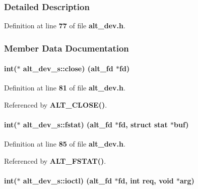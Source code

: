 \subsubsection{Detailed Description}


Definition at line {\bf 77} of file {\bf alt\+\_\+dev.\+h}.



\subsubsection{Member Data Documentation}
\paragraph[{close}]{\setlength{\rightskip}{0pt plus 5cm}int($\ast$ alt\+\_\+dev\+\_\+s\+::close) ({\bf alt\+\_\+fd} $\ast$fd)}\label{structalt__dev__s_a66e8627cb39b60dcb9623fa288c2284d}


Definition at line {\bf 81} of file {\bf alt\+\_\+dev.\+h}.



Referenced by {\bf A\+L\+T\+\_\+\+C\+L\+O\+S\+E()}.

\paragraph[{fstat}]{\setlength{\rightskip}{0pt plus 5cm}int($\ast$ alt\+\_\+dev\+\_\+s\+::fstat) ({\bf alt\+\_\+fd} $\ast$fd, struct stat $\ast$buf)}\label{structalt__dev__s_ad7600cd6f6a1288d7cba7e70e2b527cd}


Definition at line {\bf 85} of file {\bf alt\+\_\+dev.\+h}.



Referenced by {\bf A\+L\+T\+\_\+\+F\+S\+T\+A\+T()}.

\paragraph[{ioctl}]{\setlength{\rightskip}{0pt plus 5cm}int($\ast$ alt\+\_\+dev\+\_\+s\+::ioctl) ({\bf alt\+\_\+fd} $\ast$fd, int req, void $\ast$arg)}\label{structalt__dev__s_a4e4ed24845ef851676aac4ab7ca6da69}


